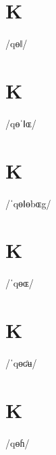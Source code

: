 \documentclass[10pt,a4paper,twoside]{book}
\begin{document}
\section*{K}

\begin{multicols}{3}
 {/qɵǁ/} {}
\end{multicols}

\section*{K}

\begin{multicols}{3}
 {/qɵˈǁɶ/} {}
\end{multicols}

\section*{K}

\begin{multicols}{3}
 {/ˈqɵǁɵbɶg/} {}
\end{multicols}

\section*{K}

\begin{multicols}{3}
 {/ˈqɵɶ/} {}
\end{multicols}

\section*{K}

\begin{multicols}{3}
 {/ˈqɵʛʉ/} {}
\end{multicols}

\section*{K}

\begin{multicols}{3}
 {/qɵɦ/} {}
\end{multicols}
\end{document}
